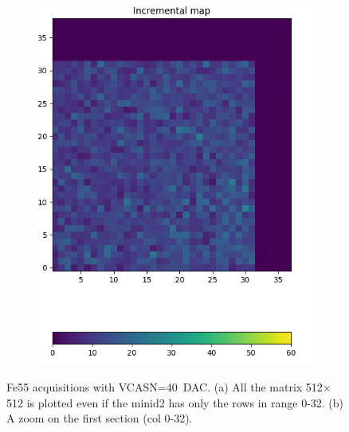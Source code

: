 \begin{figure}
\begin{subfigure}[b]{0.49\textwidth}
            \centering
            \includegraphics[width=\linewidth]{figures/charaterization/ARCADIA/Fe55_6min30s.png}
            \caption{}
            \label{fig:ARCADIA_Fe55b}
        \end{subfigure}
        \caption{Fe55 acquisitions with VCASN=\SI{40}{DAC}. (a) All the matrix 512$\times$512 is plotted even if the minid2 has only the rows in range 0-32. (b) A zoom on the first section (col 0-32). }
        \label{fig:ARCADIA_Fe55}
    \end{figure} 

